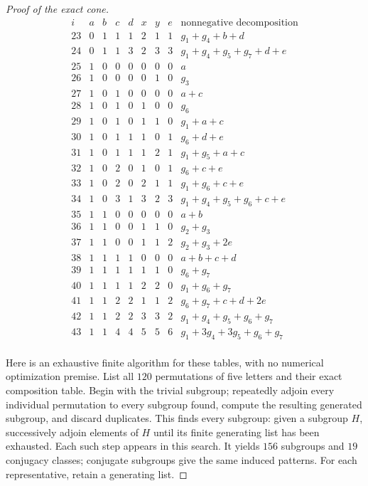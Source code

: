 \begin{proof}[Proof of the exact cone]
\[
\begin{array}{r|rrrrrrr|l}
 i&a&b&c&d&x&y&e&\text{nonnegative decomposition}\\\hline
23 & 0 & 1 & 1 & 1 & 2 & 1 & 1 & g_1+g_4+b+d \\
24 & 0 & 1 & 1 & 3 & 2 & 3 & 3 & g_1+g_4+g_5+g_7+d+e \\
25 & 1 & 0 & 0 & 0 & 0 & 0 & 0 & a \\
26 & 1 & 0 & 0 & 0 & 0 & 1 & 0 & g_3 \\
27 & 1 & 0 & 1 & 0 & 0 & 0 & 0 & a+c \\
28 & 1 & 0 & 1 & 0 & 1 & 0 & 0 & g_6 \\
29 & 1 & 0 & 1 & 0 & 1 & 1 & 0 & g_1+a+c \\
30 & 1 & 0 & 1 & 1 & 1 & 0 & 1 & g_6+d+e \\
31 & 1 & 0 & 1 & 1 & 1 & 2 & 1 & g_1+g_5+a+c \\
32 & 1 & 0 & 2 & 0 & 1 & 0 & 1 & g_6+c+e \\
33 & 1 & 0 & 2 & 0 & 2 & 1 & 1 & g_1+g_6+c+e \\
34 & 1 & 0 & 3 & 1 & 3 & 2 & 3 & g_1+g_4+g_5+g_6+c+e \\
35 & 1 & 1 & 0 & 0 & 0 & 0 & 0 & a+b \\
36 & 1 & 1 & 0 & 0 & 1 & 1 & 0 & g_2+g_3 \\
37 & 1 & 1 & 0 & 0 & 1 & 1 & 2 & g_2+g_3+2e \\
38 & 1 & 1 & 1 & 1 & 0 & 0 & 0 & a+b+c+d \\
39 & 1 & 1 & 1 & 1 & 1 & 1 & 0 & g_6+g_7 \\
40 & 1 & 1 & 1 & 1 & 2 & 2 & 0 & g_1+g_6+g_7 \\
41 & 1 & 1 & 2 & 2 & 1 & 1 & 2 & g_6+g_7+c+d+2e \\
42 & 1 & 1 & 2 & 2 & 3 & 3 & 2 & g_1+g_4+g_5+g_6+g_7 \\
43 & 1 & 1 & 4 & 4 & 5 & 5 & 6 & g_1+3g_4+3g_5+g_6+g_7 \\
\end{array}
\]

Here is an exhaustive finite algorithm for these tables, with no
numerical optimization premise.  List all $120$ permutations of
five letters and their exact composition table.  Begin with the
trivial subgroup; repeatedly adjoin every individual permutation
to every subgroup found, compute the resulting generated subgroup,
and discard duplicates.  This finds every subgroup: given a
subgroup $H$, successively adjoin elements of $H$ until its
finite generating list has been exhausted.  Each such step appears
in this search.  It yields $156$ subgroups and $19$ conjugacy
classes; conjugate subgroups give the same induced patterns.
For each representative, retain a generating list.


\end{proof}
